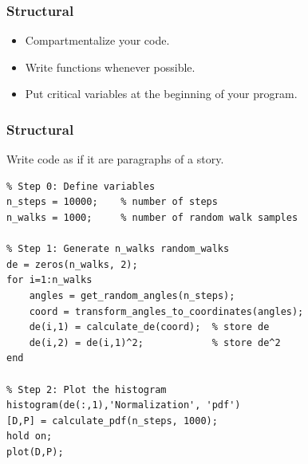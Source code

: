 \begin{frame}[fragile]
  \frametitle{Structural}
  \begin{itemize}
      \item Compartmentalize your code.
      \item Write functions whenever possible.
      \item Put critical variables at the beginning of your program.
  \end{itemize}  
\end{frame}

\begin{frame}[fragile]
  \frametitle{Structural}
    Write code as if it are paragraphs of a story.
    \begin{lstlisting}
% Step 0: Define variables
n_steps = 10000;    % number of steps
n_walks = 1000;     % number of random walk samples

% Step 1: Generate n_walks random_walks
de = zeros(n_walks, 2);
for i=1:n_walks
    angles = get_random_angles(n_steps);
    coord = transform_angles_to_coordinates(angles);
    de(i,1) = calculate_de(coord);  % store de
    de(i,2) = de(i,1)^2;            % store de^2
end

% Step 2: Plot the histogram
histogram(de(:,1),'Normalization', 'pdf')
[D,P] = calculate_pdf(n_steps, 1000);
hold on;
plot(D,P);
    \end{lstlisting}
\end{frame}

